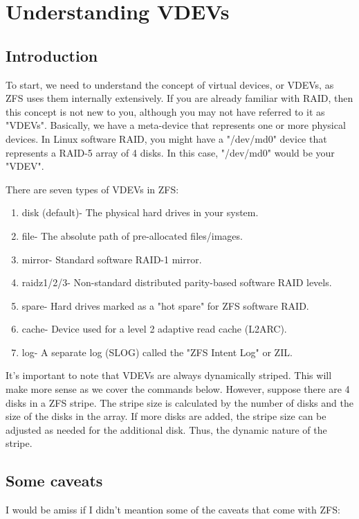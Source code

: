 \documentclass{book}
\begin{document}
\chapter{Understanding VDEVs}
\section{Introduction}
To start, we need to understand the concept of virtual devices, or VDEVs,
as ZFS uses them internally extensively. If you are already familiar with
RAID, then this concept is not new to you, although you may not have
referred to it as "VDEVs". Basically, we have a meta-device that represents
one or more physical devices. In Linux software RAID, you might have a
"/dev/md0" device that represents a RAID-5 array of 4 disks. In this case,
"/dev/md0" would be your "VDEV".

There are seven types of VDEVs in ZFS:

\begin{enumerate}
\item disk (default)- The physical hard drives in your system.
\item file- The absolute path of pre-allocated files/images.
\item mirror- Standard software RAID-1 mirror.
\item raidz1/2/3- Non-standard distributed parity-based software RAID levels.
\item spare- Hard drives marked as a "hot spare" for ZFS software RAID.
\item cache- Device used for a level 2 adaptive read cache (L2ARC).
\item log- A separate log (SLOG) called the "ZFS Intent Log" or ZIL.
\end{enumerate}

It's important to note that VDEVs are always dynamically striped. This will
make more sense as we cover the commands below. However, suppose there are
4 disks in a ZFS stripe. The stripe size is calculated by the number of
disks and the size of the disks in the array. If more disks are added, the
stripe size can be adjusted as needed for the additional disk. Thus, the
dynamic nature of the stripe.

\section{Some caveats}
I would be amiss if I didn't meantion some of the caveats that come with
ZFS:
\end{document}
